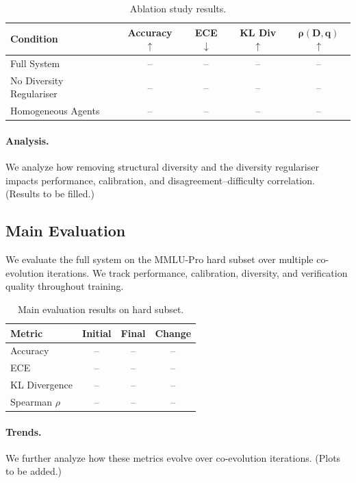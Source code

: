 \documentclass{article}
\begin{document}
\begin{table}[h]
\centering
\caption{Ablation study results.}
\label{tab:ablation}
\begin{tabular}{lcccc}
\toprule
\textbf{Condition} & \textbf{Accuracy} $\uparrow$ & \textbf{ECE} $\downarrow$ & \textbf{KL Div} $\uparrow$ & $\boldsymbol{\rho(D,q)}$ $\uparrow$ \\
\midrule
Full System & -- & -- & -- & -- \\
No Diversity Regulariser & -- & -- & -- & -- \\
Homogeneous Agents & -- & -- & -- & -- \\
\bottomrule
\end{tabular}
\end{table}

\paragraph{Analysis.}
We analyze how removing structural diversity and the diversity regulariser impacts performance, calibration, and disagreement–difficulty correlation. (Results to be filled.)

\subsection{Main Evaluation}

We evaluate the full system on the MMLU-Pro hard subset over multiple co-evolution iterations. We track performance, calibration, diversity, and verification quality throughout training.

\begin{table}[h]
\centering
\caption{Main evaluation results on hard subset.}
\label{tab:main_results}
\begin{tabular}{lccc}
\toprule
\textbf{Metric} & \textbf{Initial} & \textbf{Final} & \textbf{Change} \\
\midrule
Accuracy & -- & -- & -- \\
ECE & -- & -- & -- \\
KL Divergence & -- & -- & -- \\
Spearman $\rho$ & -- & -- & -- \\
\bottomrule
\end{tabular}
\end{table}

\paragraph{Trends.}
We further analyze how these metrics evolve over co-evolution iterations. (Plots to be added.)
\end{document}
